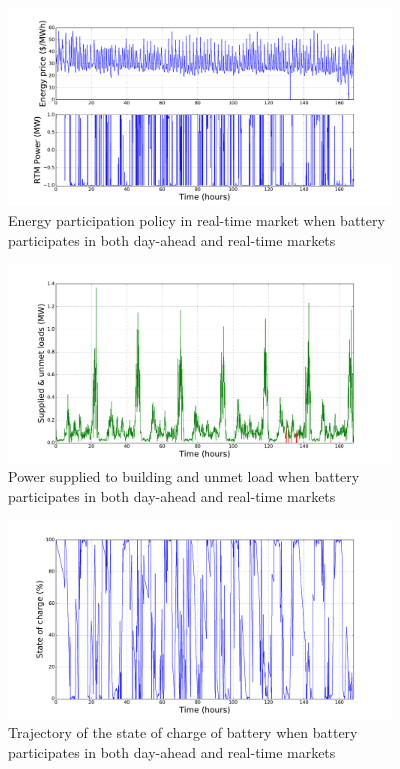 \documentclass[11pt,twoside]{article}
\begin{document}
\begin{figure}[h!]
\begin{center}
\includegraphics[width=4in]{Figures/Plots/fullproblem_stoch/Prtm_fp_st.pdf} \caption{Energy participation policy in real-time market when battery participates in both day-ahead and real-time markets}\label{fig:Prtm_fp_st}\end{center}
\end{figure}
\begin{figure}[h!]
\begin{center}
\includegraphics[width=4in]
{Figures/Plots/fullproblem_stoch/supp_unmet_fp_st.pdf} \caption{Power supplied to building and unmet load when battery participates in both day-ahead and real-time markets}\label{fig:supp_unmet_fp_st}\end{center}
\end{figure}
\begin{figure}[h!]
\begin{center}
\includegraphics[width=4in]
{Figures/Plots/fullproblem_stoch/soc_fp_st.pdf} \caption{Trajectory of the state of charge of battery when battery participates in both day-ahead and real-time markets}\label{fig:soc_fp_st}\end{center}
\end{figure}
\end{document}
